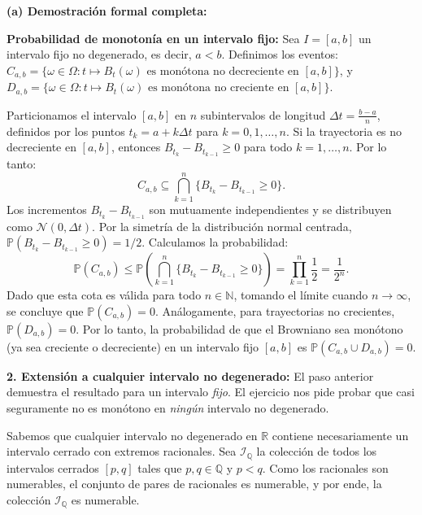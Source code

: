 \documentclass[11pt, letterpaper]{article}
\begin{document}
\begin{solucion}
    \vspace{3mm}
    \textbf{(a) Demostración formal completa:}

    \textbf{Probabilidad de monotonía en un intervalo fijo:}
    Sea $I = [a, b]$ un intervalo fijo no degenerado, es decir, $a < b$.
    Definimos los eventos:
    $C_{a,b} = \{ \omega \in \Omega : t \mapsto B_t(\omega) \text{ es monótona no decreciente en } [a,b] \}$, y
    $D_{a,b} = \{ \omega \in \Omega : t \mapsto B_t(\omega) \text{ es monótona no creciente en } [a,b] \}$.
    
    Particionamos el intervalo $[a, b]$ en $n$ subintervalos de longitud $\Delta t = \frac{b-a}{n}$, definidos por los puntos $t_k = a + k\Delta t$ para $k = 0, 1, \dots, n$.
    Si la trayectoria es no decreciente en $[a,b]$, entonces $B_{t_k} - B_{t_{k-1}} \ge 0$ para todo $k = 1, \dots, n$.
    Por lo tanto:
    \[ C_{a,b} \subseteq \bigcap_{k=1}^n \{ B_{t_k} - B_{t_{k-1}} \ge 0 \}. \]
    Los incrementos $B_{t_k} - B_{t_{k-1}}$ son mutuamente independientes y se distribuyen como $\mathcal{N}(0, \Delta t)$. Por la simetría de la distribución normal centrada, $\mathbb{P}(B_{t_k} - B_{t_{k-1}} \ge 0) = 1/2$.
    Calculamos la probabilidad:
    \[ \mathbb{P}(C_{a,b}) \le \mathbb{P}\left( \bigcap_{k=1}^n \{ B_{t_k} - B_{t_{k-1}} \ge 0 \} \right) = \prod_{k=1}^n \frac{1}{2} = \frac{1}{2^n}. \]
    Dado que esta cota es válida para todo $n \in \mathbb{N}$, tomando el límite cuando $n \to \infty$, se concluye que $\mathbb{P}(C_{a,b}) = 0$.
    Análogamente, para trayectorias no crecientes, $\mathbb{P}(D_{a,b}) = 0$.
    Por lo tanto, la probabilidad de que el Browniano sea monótono (ya sea creciente o decreciente) en un intervalo fijo $[a,b]$ es $\mathbb{P}(C_{a,b} \cup D_{a,b}) = 0$.

    \textbf{2. Extensión a cualquier intervalo no degenerado:}
    El paso anterior demuestra el resultado para un intervalo \textit{fijo}. El ejercicio nos pide probar que casi seguramente no es monótono en \textit{ningún} intervalo no degenerado.
    
    Sabemos que cualquier intervalo no degenerado en $\mathbb{R}$ contiene necesariamente un intervalo cerrado con extremos racionales.
    Sea $\mathcal{I}_\mathbb{Q}$ la colección de todos los intervalos cerrados $[p, q]$ tales que $p, q \in \mathbb{Q}$ y $p < q$. 
    Como los racionales son numerables, el conjunto de pares de racionales es numerable, y por ende, la colección $\mathcal{I}_\mathbb{Q}$ es numerable.
    

\end{solucion}
\end{document}
